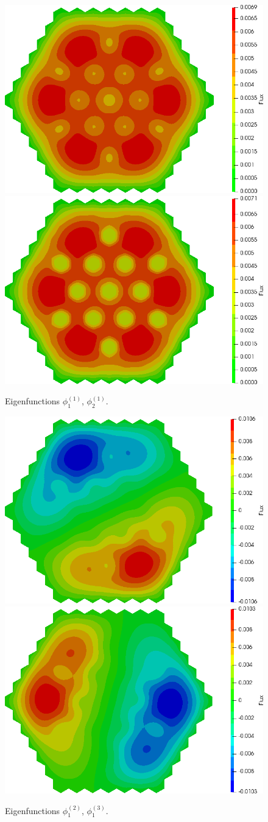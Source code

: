\documentclass[authoryear]{elsarticle}
\begin{document}
\begin{figure}[H]
\begin{center}
	\includegraphics[width=0.49\linewidth]{iaea_without/alpha_delayed_sp3_u1_1_without.png}
	\includegraphics[width=0.49\linewidth]{iaea_without/alpha_delayed_sp3_u2_1_without.png}\\
	\caption{Eigenfunctions $\phi_1^{(1)}$, $\phi_2^{(1)}$.}
	\label{fig:iaea_without_fun_del_1}
\end{center}
\end{figure}
\begin{figure}[H]
\begin{center}
	\includegraphics[width=0.49\linewidth]{iaea_without/alpha_delayed_sp3_u1_2_without.png}
	\includegraphics[width=0.49\linewidth]{iaea_without/alpha_delayed_sp3_u1_3_without.png}\\
	\caption{Eigenfunctions $\phi_1^{(2)}$, $\phi_1^{(3)}$.}
	\label{fig:iaea_without_fun_del_2}
\end{center}
\end{figure}
\end{document}
